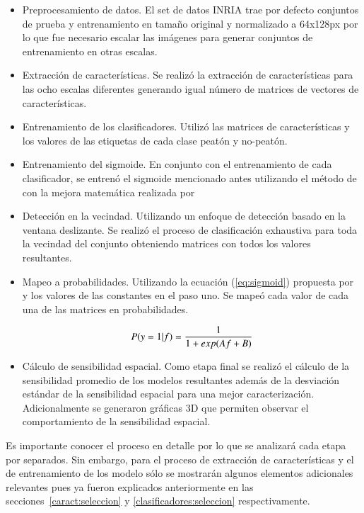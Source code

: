 \begin{itemize}
\item Preprocesamiento de datos. El set de datos INRIA trae por defecto conjuntos de prueba y entrenamiento en tamaño original y normalizado a 64x128px por lo que fue necesario escalar las imágenes para generar conjuntos de entrenamiento en otras escalas.
\item Extracción de características. Se realizó la extracción de características para las ocho escalas diferentes generando igual número de matrices de vectores de características.
\item Entrenamiento de los clasificadores. Utilizó las matrices de características y los valores de las etiquetas de cada clase peatón y no-peatón.
\item Entrenamiento del sigmoide. En conjunto con el entrenamiento de cada clasificador, se entrenó el sigmoide mencionado antes utilizando el método de \cite{Platt1999} con la mejora matemática realizada por \cite{Lin2000}
\item Detección en la vecindad. Utilizando un enfoque de detección basado en la ventana deslizante. Se realizó el proceso de clasificación exhaustiva para toda la vecindad del conjunto obteniendo matrices con todos los valores resultantes.
\item Mapeo a probabilidades. Utilizando la ecuación (\ref{eq:sigmoid}) propuesta por \cite{Platt1999} y los valores de las constantes en el paso uno. Se mapeó cada valor de cada una de las matrices en probabilidades.
    
\begin{equation}
\centering
\label{eq:sigmoid}
P(y=1|f)=\frac{1}{1+exp(Af+B)}
\end{equation}

\item Cálculo de sensibilidad espacial. Como etapa final se realizó el cálculo de la sensibilidad promedio de los modelos resultantes además de la desviación estándar de la sensibilidad espacial para una mejor caracterización. Adicionalmente se generaron gráficas 3D que permiten observar el comportamiento de la sensibilidad espacial.
\end{itemize}

Es importante conocer el proceso en detalle por lo que se analizará cada etapa por separados. Sin embargo, para el proceso de extracción de características y el de entrenamiento de los modelo sólo se mostrarán algunos elementos adicionales relevantes pues ya fueron explicados anteriormente en las secciones~\ref{caract:seleccion} y \ref{clasificadores:seleccion} respectivamente.

